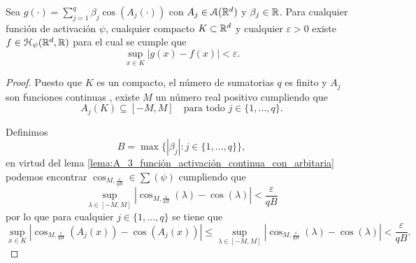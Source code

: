 \begin{lema}\label{lema:A_4_sum_cos_aproxima}
    Sea $g(\cdot) = \sum_{j=1}^q \beta_j \cos(A_j(\cdot))$ con 
    $A_j \in \mathcal{A}(\mathbb{R}^d)$ y $\beta_j \in \mathbb{R}$.
    Para cualquier función de activación $\psi$, 
    cualquier compacto $K \subset \mathbb{R}^d$
    y cualquier $\varepsilon > 0$
    existe $f \in \mathcal{H}_\psi{(\mathbb{R}^d, \mathbb{R})}$ para el cual se cumple que 
    \begin{equation}
        \sup_{x \in K} 
        |g(x) - f(x)| < \varepsilon.
    \end{equation}
\end{lema}
\begin{proof}
    Puesto que $K$ es un compacto, el número de sumatorias $q$
    es finito y $A_j$ son funciones continuas
    , existe
     $M$ un número real positivo  cumpliendo que
    \begin{equation}
        A_j(K) \subseteq [-M, M] 
        \quad 
        \text{para todo } j \in \{1, ..., q \}. 
    \end{equation} 

    Definimos  
    \begin{equation}
        B = \max \{ |\beta_j| :  j \in \{1, ..., q \}\},
    \end{equation}
    en virtud del lema \ref{lema:A_3_función_activación_continua_con_arbitaria}
    podemos encontrar
    $\cos_{M, \frac{\varepsilon}{q B}} \in \sum(\psi)$ cumpliendo que
    \begin{equation}
        \sup_{\lambda \in [-M, M]} | 
        \cos_{M, \frac{\varepsilon}{q B}}(\lambda)
        - 
        \cos(\lambda)
        | 
        < \frac{\varepsilon}{q B} 
    \end{equation}
    por lo que para cualquier  $j \in \{1, ..., q \}$   se tiene que 
    \begin{equation}
        \sup_{x \in K} | 
        \cos_{M, \frac{\varepsilon}{q B}}(A_j(x))
        - 
        \cos(A_j(x))
        | 
        \leq  
        \sup_{\lambda \in [-M, M]} | 
        \cos_{M, \frac{\varepsilon}{q B}}(\lambda)
        - 
        \cos(\lambda)
        | 
        < \frac{\varepsilon}{q B}. 
    \end{equation}


\end{proof}
